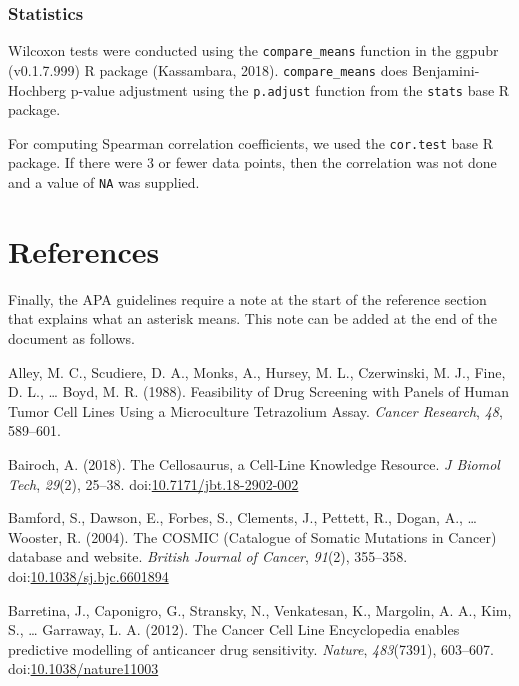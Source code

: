 \documentclass[man,floatsintext]{apa6}
\begin{document}
\subsubsection{Statistics}\label{statistics}

Wilcoxon tests were conducted using the \texttt{compare\_means} function
in the ggpubr (v0.1.7.999) R package (Kassambara, 2018).
\texttt{compare\_means} does Benjamini-Hochberg p-value adjustment using
the \texttt{p.adjust} function from the \texttt{stats} base R package.

For computing Spearman correlation coefficients, we used the
\texttt{cor.test} base R package. If there were 3 or fewer data points,
then the correlation was not done and a value of \texttt{NA} was
supplied.

\newpage

\section{References}\label{references}

\begingroup
\setlength{\parindent}{-0.5in} \setlength{\leftskip}{0.5in}

Finally, the APA guidelines require a note at the start of the reference
section that explains what an asterisk means. This note can be added at
the end of the document as follows.

\hypertarget{refs}{}
\hypertarget{ref-alley1988}{}
Alley, M. C., Scudiere, D. A., Monks, A., Hursey, M. L., Czerwinski, M.
J., Fine, D. L., \ldots{} Boyd, M. R. (1988). Feasibility of Drug
Screening with Panels of Human Tumor Cell Lines Using a Microculture
Tetrazolium Assay. \emph{Cancer Research}, \emph{48}, 589--601.

\hypertarget{ref-bairoch2018}{}
Bairoch, A. (2018). The Cellosaurus, a Cell-Line Knowledge Resource.
\emph{J Biomol Tech}, \emph{29}(2), 25--38.
doi:\href{https://doi.org/10.7171/jbt.18-2902-002}{10.7171/jbt.18-2902-002}

\hypertarget{ref-bamford2004}{}
Bamford, S., Dawson, E., Forbes, S., Clements, J., Pettett, R., Dogan,
A., \ldots{} Wooster, R. (2004). The COSMIC (Catalogue of Somatic
Mutations in Cancer) database and website. \emph{British Journal of
Cancer}, \emph{91}(2), 355--358.
doi:\href{https://doi.org/10.1038/sj.bjc.6601894}{10.1038/sj.bjc.6601894}

\hypertarget{ref-barretina2012}{}
Barretina, J., Caponigro, G., Stransky, N., Venkatesan, K., Margolin, A.
A., Kim, S., \ldots{} Garraway, L. A. (2012). The Cancer Cell Line
Encyclopedia enables predictive modelling of anticancer drug
sensitivity. \emph{Nature}, \emph{483}(7391), 603--607.
doi:\href{https://doi.org/10.1038/nature11003}{10.1038/nature11003}
\end{document}
